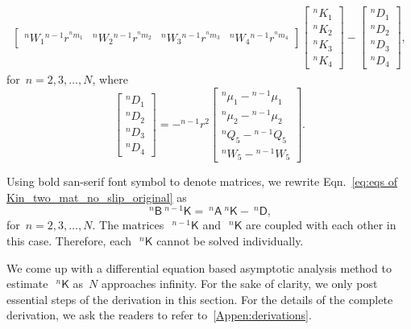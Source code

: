 \documentclass[preprint,10pt,times]{elsarticle}
\numberwithin{equation}{section}
\renewcommand{\u}[1]{\boldsymbol{#1}}
\newcommand{\usf}[1]{\u{\mathsf #1}}
\renewcommand{\>}{$\Rightarrow$}
\begin{document}
\begin{equation}
\begin{aligned}
\begin{bmatrix}
	{}^{n}\!{W_{1}} {}^{n-1}\!{r}^{{}^{n}\!{m_{1}}} & {}^{n}\!{W_{2}} {}^{n-1}\!{r}^{{}^{n}\!{m_{2}}} & {}^{n}\!{W_{3}} {}^{n-1}\!{r}^{{}^{n}\!{m_{3}}} & {}^{n}\!{W_{4}} {}^{n-1}\!{r}^{{}^{n}\!{m_{4}}}
  \end{bmatrix}
  \begin{bmatrix}
	{}^{n}\!{K_{1}} \\ {}^{n}\!{K_{2}} \\ {}^{n}\!{K_{3}} \\ {}^{n}\!{K_{4}}
  \end{bmatrix}
-
\begin{bmatrix}
	{}^{n}\!{D_{1}} \\ {}^{n}\!{D_{2}} \\ {}^{n}\!{D_{3}} \\ {}^{n}\!{D_{4}}
\end{bmatrix},
\label{eq:eqs of Kin_two_mat_no_slip_original}
\end{aligned}
\end{equation}
for~$n = 2,3,\dots,N$, where
\begin{equation}
	\begin{bmatrix}
		{}^{n}\!{D_{1}} \\ {}^{n}\!{D_{2}} \\ {}^{n}\!{D_{3}} \\ {}^{n}\!{D_{4}}
	\end{bmatrix}
	= - {}^{n-1}\!r^2
	\begin{bmatrix}
		{}^{n}\!{\mu_{1}}-{}^{n-1}\!{\mu_{1}} \\ {}^{n}\!{\mu_{2}}-{}^{n-1}\!{\mu_{2}}  \\ {}^{n}\!{Q_{5}}-{}^{n-1}\!{Q_{5}} \\ {}^{n}\!{W_{5}}-{}^{n-1}\!{W_{5}}
	\end{bmatrix}.
\end{equation}

Using bold san-serif font symbol to denote matrices, we rewrite Eqn.~\eqref{eq:eqs of Kin_two_mat_no_slip_original} as
\begin{equation}
	~^{n}{\usf{B}} ~^{n-1}{\usf{K}} = ~^{n}{\usf{A}} ~^{n}{\usf{K}} - ~^{n}{\usf{D}},
	\label{eq:eqs of Kin_two_mat_no_slip_np1}
\end{equation}
for~$n = 2,3,\dots,N$. The matrices~$~^{{n-1}}{\usf{K}}$ and~$~^{n}{\usf{K}}$ are coupled with each other in this case. Therefore, each~$~^{n}{\usf{K}}$ cannot be solved individually.

We come up with a differential equation based asymptotic analysis method to estimate~$~^{n}{\usf{K}}$ as~$N$ approaches infinity. For the sake of clarity, we only post essential steps of the derivation in this section. For the details of the complete derivation, we ask the readers to refer to~\ref{Appen:derivations}.
\end{document}

